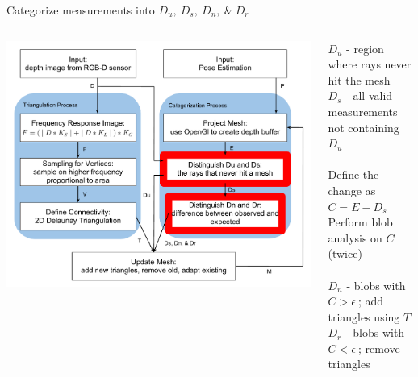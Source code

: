 \documentclass{beamer}
\begin{document}
\begin{frame}{Categorize measurements into $D_u,\ D_s,\ D_n,\ \& \ D_r$}
\vspace{-.1in}
\begin{columns}
  \begin{center}
  \includegraphics[width=\textwidth]{SDsort.pdf} 
  \end{center}
$D_u$ - region where rays never hit the mesh \\
$D_s$ - all valid measurements not containing $D_u$ \\
~\\
Define the change as $C = E - D_s$ \\
Perform blob analysis on $C$ (twice)  \\
~\\
$D_n$ - blobs with $C>\epsilon\ $; add triangles using $T$ \\
$D_r$ - blobs with $C<\epsilon\ $; remove triangles
\end{columns}
\end{frame}
\end{document}
